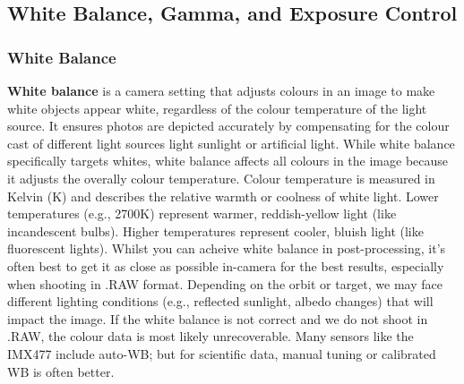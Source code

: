 \subsection{White Balance, Gamma, and Exposure Control}
\subsubsection{White Balance}
\textbf{White balance} is a camera setting that adjusts colours in an image to make white objects appear white, regardless of the colour temperature of the light source. It ensures photos are depicted accurately by compensating for the colour cast of different light sources light sunlight or artificial light.
While white balance specifically targets whites, white balance affects all colours in the image because it adjusts the overally colour temperature.
\nl
Colour temperature is measured in Kelvin (K) and describes the relative warmth or coolness of white light. Lower temperatures (e.g., 2700K) represent warmer, reddish-yellow light (like incandescent bulbs).
Higher temperatures represent cooler, bluish light (like fluorescent lights).
\nl
Whilst you can acheive white balance in post-processing, it's often best to get it as close as possible in-camera for the best results, especially when shooting in .RAW format.
\nl
Depending on the orbit or target, we may face different lighting conditions (e.g., reflected sunlight, albedo changes) that will impact the image. If the white balance is not correct and we do not shoot in .RAW, the colour data is most likely unrecoverable. Many sensors like the IMX477 include auto-WB; but for scientific data, manual tuning or calibrated WB is often better.


